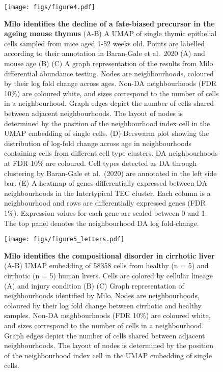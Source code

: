 \documentclass[
  10pt,
]{article}
\begin{document}
\begin{figure}
\centering
\texttt{[image: figs/figure4.pdf]}
\caption{\label{fig:fig-4}\textbf{Milo identifies the decline of a fate-biased precursor in the ageing mouse thymus}
(A-B) A UMAP of single thymic epithelial cells sampled from mice aged 1-52 weeks old. Points are labelled according to their annotation in Baran-Gale et al.~2020 (A) and mouse age (B)
(C) A graph representation of the results from Milo differential abundance testing. Nodes are neighbourhoods, coloured by their log fold change across ages. Non-DA neighbourhoods (FDR 10\%) are coloured white, and sizes correspond to the number of cells in a neighbourhood. Graph edges depict the number of cells shared between adjacent neighbourhoods. The layout of nodes is determined by the position of the neighbourhood index cell in the UMAP embedding of single cells.
(D) Beeswarm plot showing the distribution of log-fold change across age in neighbourhoods containing cells from different cell type clusters. DA neighbourhoods at FDR 10\% are coloured. Cell types detected as DA through clustering by Baran-Gale et al.~(2020) are annotated in the left side bar.
(E) A heatmap of genes differentially expressed between DA neighbourhoods in the Intertypical TEC cluster. Each column is a neighbourhood and rows are differentially expressed genes (FDR 1\%). Expression values for each gene are scaled between 0 and 1. The top panel denotes the neighbourhood DA log fold-change.}
\end{figure}







\begin{figure}
\centering
\texttt{[image: figs/figure5\_letters.pdf]}
\caption{\label{fig:fig-5}\textbf{Milo identifies the compositional disorder in cirrhotic liver}
(A-B) UMAP embedding of 58358 cells from healthy (n = 5) and cirrhotic (n = 5) human livers. Cells are colored by cellular lineage (A) and injury condition (B)
(C) Graph representation of neighbourhoods identified by Milo.
Nodes are neighbourhoods, coloured by their log fold change between cirrhotic and healthy samples. Non-DA neighbourhoods (FDR 10\%) are coloured white, and sizes correspond to the number of cells in a neighbourhood. Graph edges depict the number of cells shared between adjacent neighbourhoods. The layout of nodes is determined by the position of the neighbourhood index cell in the UMAP embedding of single cells.}
\end{figure}
\end{document}
